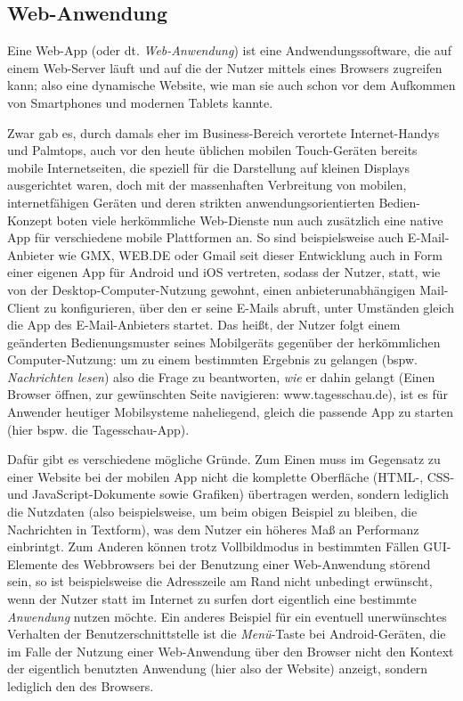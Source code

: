 \subsection{Web-Anwendung}

Eine Web-App (oder dt. \emph{Web-Anwendung}) ist eine Andwendungssoftware, die auf einem Web-Server läuft und auf die der Nutzer mittels eines Browsers zugreifen kann; also eine dynamische Website, wie man sie auch schon vor dem Aufkommen von Smartphones und modernen Tablets kannte. 

Zwar gab es, durch damals eher im Business-Bereich verortete Internet-Handys und Palmtops, auch vor den heute üblichen mobilen Touch-Geräten bereits mobile Internetseiten, die speziell für die Darstellung auf kleinen Displays ausgerichtet waren, doch mit der massenhaften Verbreitung von mobilen, internetfähigen Geräten und deren strikten anwendungsorientierten Bedien-Konzept boten viele herkömmliche Web-Dienste nun auch zusätzlich eine native App für verschiedene mobile Plattformen an. 
So sind beispielsweise auch E-Mail-Anbieter wie GMX\cite{gmx}, WEB.DE\cite{web.de} oder Gmail\cite{gmail} seit dieser Entwicklung auch in Form einer eigenen App für Android und iOS vertreten, sodass der Nutzer, statt, wie von der Desktop-Computer-Nutzung gewohnt, einen anbieterunabhängigen Mail-Client zu konfigurieren, über den er seine E-Mails abruft, unter Umständen gleich die App des E-Mail-Anbieters startet. 
Das heißt, der Nutzer folgt einem geänderten Bedienungsmuster seines Mobilgeräts gegenüber der herkömmlichen Computer-Nutzung: um zu einem bestimmten Ergebnis zu gelangen (bspw. \emph{Nachrichten lesen}) also die Frage zu beantworten, \emph{wie} er dahin gelangt (Einen Browser öffnen, zur gewünschten Seite navigieren: www.tagesschau.de), ist es für Anwender heutiger Mobilsysteme naheliegend, gleich die passende App zu starten (hier bspw. die Tagesschau-App).

Dafür gibt es verschiedene mögliche Gründe. Zum Einen muss im Gegensatz zu einer Website bei der mobilen App nicht die komplette Oberfläche (HTML-, CSS- und JavaScript-Dokumente sowie Grafiken) übertragen werden, sondern lediglich die Nutzdaten (also beispielsweise, um beim obigen Beispiel zu bleiben, die Nachrichten in Textform), was dem Nutzer ein höheres Maß an Performanz einbrintgt.
Zum Anderen können trotz Vollbildmodus in bestimmten Fällen GUI-Elemente des Webbrowsers bei der Benutzung einer Web-Anwendung störend sein, so ist beispielsweise die Adresszeile am Rand nicht unbedingt erwünscht, wenn der Nutzer statt im Internet zu surfen dort eigentlich eine bestimmte \emph{Anwendung} nutzen möchte. 
Ein anderes Beispiel für ein eventuell unerwünschtes Verhalten der Benutzerschnittstelle ist die \emph{Menü}-Taste bei Android-Geräten, die im Falle der Nutzung einer Web-Anwendung über den Browser nicht den Kontext der eigentlich benutzten Anwendung (hier also der Website) anzeigt, sondern lediglich den des Browsers.

